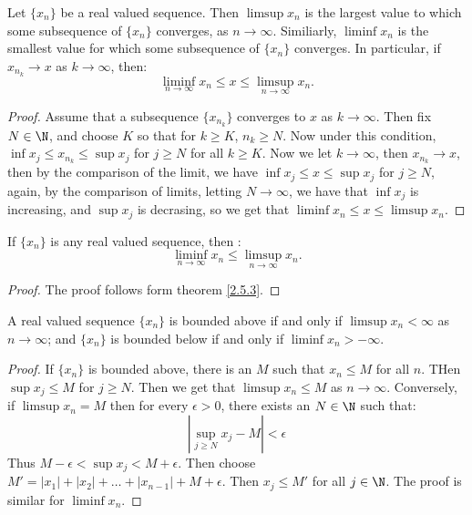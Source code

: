 \begin{theorem}\label{2.5.3}
    Let  $\{x_n\}$ be a real valued sequence. Then $\limsup{x_n}$ is the largest 
    value to which some subsequence of $\{x_n\}$ converges, as  $n \rightarrow \infty$. 
    Similiarly,  $\liminf{x_n}$ is the smallest value for which some subsequence 
    of  $\{x_n\}$ converges.  In particular, if $x_{n_k} \rightarrow x$ as  
    $k \rightarrow \infty$, then:
        \begin{equation*}
            \liminf_{n \rightarrow \infty}{x_n} \leq x \leq \limsup_{n \rightarrow \infty}{x_n}.
        \end{equation*} 
\end{theorem}
\begin{proof}
    Assume that a subsequence $\{x_{n_k}\}$ converges to  $x$ as  $k \rightarrow \infty$. 
    Then fix $N \in \N$, and choose  $K$ so that for $k \geq K$, $n_k \geq N$. 
    Now under this condition, $\inf{x_j} \leq x_{n_k} \leq \sup{x_j}$ for $j \geq N$ 
    for all  $k \geq K$. Now we let  $k \rightarrow \infty$, then  $x_{n_k} \rightarrow x$, 
    then by the comparison of the limit, we have  $\inf{x_j} \leq x \leq \sup{x_j}$ 
    for  $j \geq N$, again, by the comparison of limits, letting $N \rightarrow \infty$, 
    we have that  $\inf{x_j}$ is increasing, and $\sup{x_j}$ is decrasing, so 
    we get that $\liminf{x_n} \leq x \leq \limsup{x_n}$.
\end{proof}

\begin{corollary} 
    If $\{x_n\}$ is any real valued sequence, then :
        \begin{equation*}
            \liminf_{n \rightarrow \infty}{x_n} \leq \limsup_{n \rightarrow \infty}{x_n}.
        \end{equation*} 
\end{corollary}
\begin{proof}
    The proof follows form theorem \ref{2.5.3}.		
\end{proof}

\begin{remark} 
    A real valued sequence $\{x_n\}$ is bounded above if and only if  
    $\limsup{x_n}<\infty$ as  $n \rightarrow \infty$; and  $\{x_n\}$ is bounded below 
    if and only if  $\liminf{x_n}>-\infty$.
\end{remark}
\begin{proof}
    If $\{x_n\}$ is bounded above, there is an  $M$ such that  $x_n \leq M$ for 
    all $n$. THen  $\sup{x_j} \leq M$ for  $j \geq N$. Then we get that  
    $\limsup{x_n} \leq M$ as  $n \rightarrow \infty$. Conversely, if  $\limsup{x_n}=M$ 
    then for every  $\epsilon>0$, there exists an  $N \in \N$ such that:
        \begin{equation*}
            |\sup_{j \geq N}{x_j}-M|<\epsilon
        \end{equation*}
    Thus $M-\epsilon<\sup{x_j}<M+\epsilon$. Then choose  $M'=|x_1|+|x_2|+
    \dots+|x_{n-1}|+M+\epsilon$. Then  $x_j \leq M'$ for all  $j \in \N$. The 
    proof is similar for $\liminf{x_n}$.
\end{proof}

